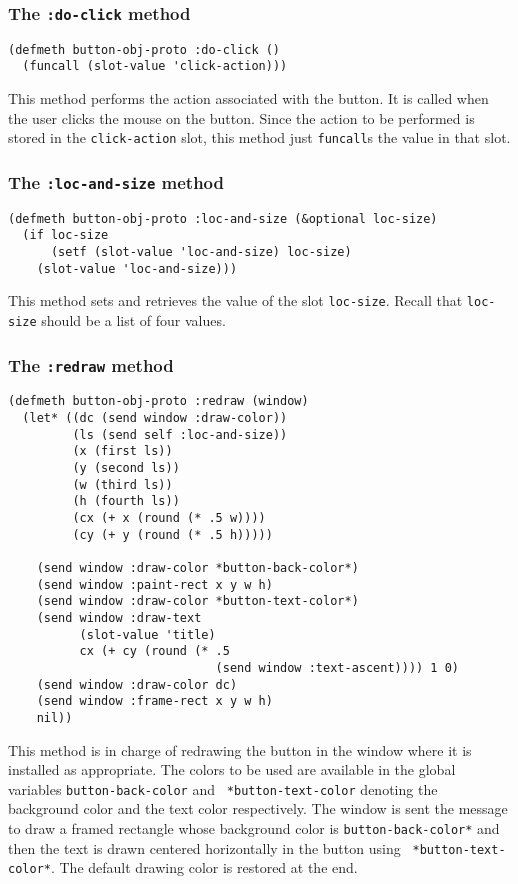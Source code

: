 \subsubsection{The {\tt :do-click} method}
\label{subsubsec:buttons-do-click}
\begin{verbatim}
(defmeth button-obj-proto :do-click ()
  (funcall (slot-value 'click-action)))
\end{verbatim}
This method performs the action associated with the button.  It is
called when the user clicks the mouse on the button.  Since the action
to be performed is stored in the {\tt click-action} slot, this method
just {\tt funcall}s the value in that slot.

\subsubsection{The {\tt :loc-and-size} method}
\label{subsubsec:buttons-loc-and-size}
\begin{verbatim}
(defmeth button-obj-proto :loc-and-size (&optional loc-size)
  (if loc-size
      (setf (slot-value 'loc-and-size) loc-size)
    (slot-value 'loc-and-size)))
\end{verbatim}
This method sets and retrieves the value of the slot {\tt loc-size}.
Recall that {\tt loc-size} should be a list of four values.

\subsubsection{The {\tt :redraw} method}
\label{subsubsec:buttons-redraw}
\begin{verbatim}
(defmeth button-obj-proto :redraw (window)
  (let* ((dc (send window :draw-color))
         (ls (send self :loc-and-size))
         (x (first ls))
         (y (second ls))
         (w (third ls))
         (h (fourth ls))
         (cx (+ x (round (* .5 w))))
         (cy (+ y (round (* .5 h)))))

    (send window :draw-color *button-back-color*)
    (send window :paint-rect x y w h)
    (send window :draw-color *button-text-color*)
    (send window :draw-text
          (slot-value 'title)
          cx (+ cy (round (* .5 
                             (send window :text-ascent)))) 1 0)
    (send window :draw-color dc)
    (send window :frame-rect x y w h)
    nil))
\end{verbatim}
This method is in charge of redrawing the button in the window where
it is installed as appropriate.  The colors to be used are available
in the global variables {\tt *button-back-color} and {\tt
  *button-text-color} denoting the background color and the text color
respectively. The window is sent the message to draw a framed
rectangle whose background color is {\tt *button-back-color*} and then
the text is drawn centered horizontally in the button using {\tt
  *button-text-color*}. The default drawing color is restored at the
end. 

